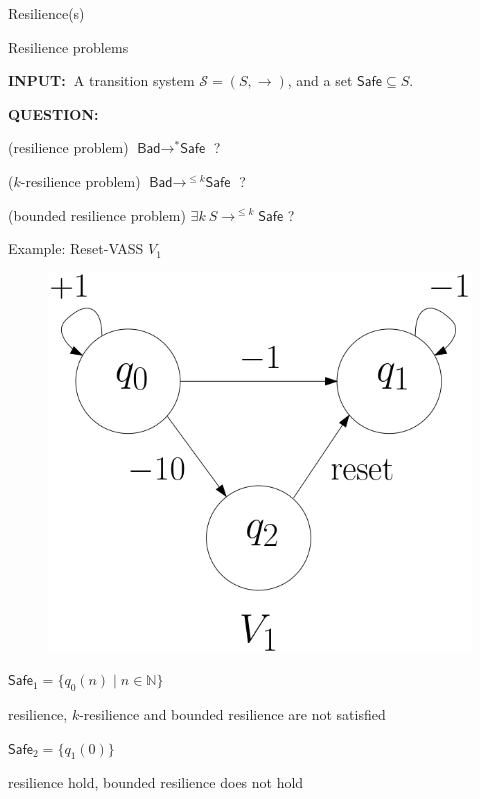 \documentclass{beamer}
\newcommand{\N}{\mathbb{N}}
\newcommand{\Bad}{\textsf{Bad}}
\newcommand{\Safe}{\textsf{Safe}}
\begin{document}
  \begin{frame}{Resilience(s)}
  



  
 {\small
  
  
{\sc Resilience problems} 

\hspace{-0.5cm}  {\bf INPUT:\ }{A transition system $\mathscr{S}=(S,\rightarrow)$, and a set $\Safe \subseteq S$.}

\hspace{-0.5cm}  {\bf QUESTION:\ } 

\hspace{-0.5cm}  ({\sc resilience problem}) $\Bad \rightarrow^{*} \Safe$ ?

\hspace{-0.5cm}  ({\sc $k$-resilience problem})		$\Bad \rightarrow^{\leq k} \Safe$ ?

\hspace{-0.5cm}  ({\sc bounded resilience problem})	$\exists k ~ S \rightarrow^{\leq k} \Safe$ ?\newline

}

  \end{frame}
  \begin{frame}{Example: Reset-VASS $V_1$}
  
  
   \begin{center}
 	\begin{figure}
 	\vspace{.06cm}
\includegraphics[width=.47\textwidth]{FigA}
	\end{figure}
\end{center}  

$\Safe_1 = \{q_0(n) \mid n \in \N\}$

{resilience}, 
{$k$-resilience} and {bounded resilience} are not satisfied


$\Safe_2 = \{q_1(0)\} $

 {resilience} hold, {bounded resilience} does not hold

  \end{frame}
\end{document}
